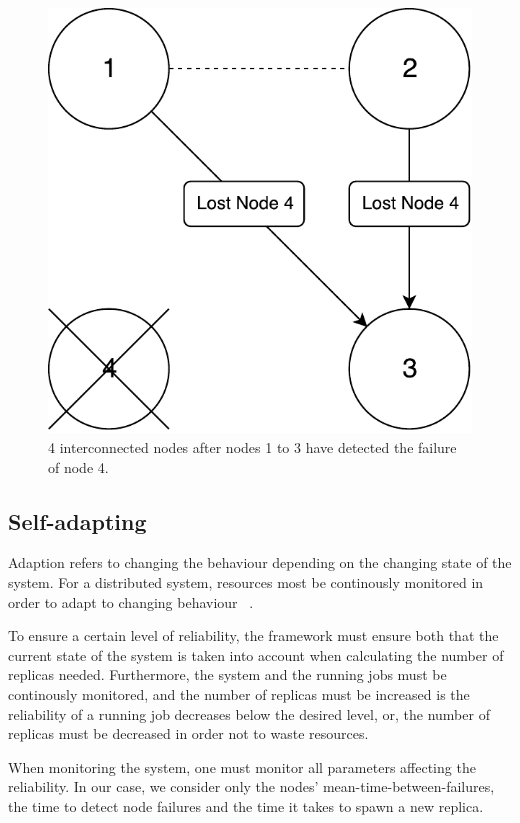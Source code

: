 \documentclass{cslthse-msc}
\begin{document}
\begin{figure}[!hbt]
\centering
\includegraphics[scale=0.5]{images/handling_node_failure.pdf}
\caption{4 interconnected nodes after nodes 1 to 3 have detected the failure of node 4.}\label{fig:handling_node_failure}
\end{figure}

\subsection{Self-adapting} \label{subsec:design_self_adapting}
Adaption refers to changing the behaviour depending on the changing state of the system. For a distributed system, resources most be continously monitored in order to adapt to changing behaviour ~\cite{imprRelAdaptRL}.

To ensure a certain level of reliability, the framework must ensure both that the current state of the system is taken into account when calculating the number of replicas needed. Furthermore, the system and the running jobs must be continously monitored, and the number of replicas must be increased is the reliability of a running job decreases below the desired level, or, the number of replicas must be decreased in order not to waste resources.

When monitoring the system, one must monitor all parameters affecting the reliability. In our case, we consider only the nodes' mean-time-between-failures, the time to detect node failures and the time it takes to spawn a new replica.
\end{document}

